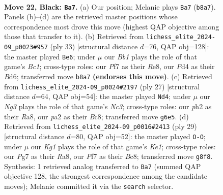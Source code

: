 \documentclass[11pt]{article}
\begin{document}
\clearpage

\begin{figure}[p]\centering
\begin{subfigure}{0.46\textwidth}\centering
\resizebox{\linewidth}{!}{%
\newchessgame
\chessboard[
  setfen={rb2r1k1/1p1b1ppp/pq2p1n1/8/3p2P1/1P5B/P2P1PQP/RNB1RK2 b - - 1 22},
  showmover=false,
  pgfstyle=straightmove, color=movearrow, markmove={b8-a7}
]}
\caption{}
\end{subfigure}\hfill
\begin{subfigure}{0.46\textwidth}\centering
\resizebox{\linewidth}{!}{%
\newchessgame
\chessboard[
  setfen={r1b1r1k1/5pp1/p1pb2qp/2p1p3/8/3P1Q1P/PPPN1PP1/R1B1R1K1 b - - 3 17},
  showmover=false,
  pgfstyle=straightmove, color=movearrow, markmove={c8-e6}
]}
\caption{}
\end{subfigure}
\\[4pt]
\begin{subfigure}{0.46\textwidth}\centering
\resizebox{\linewidth}{!}{%
\newchessgame
\chessboard[
  setfen={r1bq1rk1/1pp2ppp/p1np4/2b5/4PP2/PPN5/1BPQB1PP/R3K2R b KQ - 0 14},
  showmover=false,
  pgfstyle=straightmove, color=movearrow, markmove={c6-d4}
]}
\caption{}
\end{subfigure}\hfill
\begin{subfigure}{0.46\textwidth}\centering
\resizebox{\linewidth}{!}{%
\newchessgame
\chessboard[
  setfen={r1b1k2r/1p1pnpbp/pq2p1p1/8/2P2B2/P1N2Q2/1P3PPP/2KR1B1R b kq - 2 15},
  showmover=false,
  pgfstyle=straightmove, color=movearrow, markmove={e8-g8}
]}
\caption{}
\end{subfigure}
\caption{\textbf{Move 22, Black: \texttt{Ba7}.} (a) Our position; Melanie plays \texttt{Ba7} (\texttt{b8a7}). Panels (b)--(d) are the retrieved master positions whose correspondence most drove this move (highest QAP objective among those that transfer to it). (b) Retrieved from \texttt{lichess\_elite\_2024-09\_p0023\#957} (ply 33) [structural distance $d$=76, QAP obj=128]: the master played \texttt{Be6}; under $\mu$ our \emph{Bb1} plays the role of that game's \emph{Bc1}; cross-type roles: our \emph{P}f7 as their \emph{R}e8, our \emph{P}d4 as their \emph{B}d6; transferred move \texttt{b8a7} \textbf{(endorses this move)}. (c) Retrieved from \texttt{lichess\_elite\_2024-09\_p0024\#2197} (ply 27) [structural distance $d$=64, QAP obj=54]: the master played \texttt{Nd4}; under $\mu$ our \emph{Ng3} plays the role of that game's \emph{Nc3}; cross-type roles: our \emph{p}h2 as their \emph{R}a8, our \emph{p}a2 as their \emph{B}c8; transferred move \texttt{g6e5}. (d) Retrieved from \texttt{lichess\_elite\_2024-09\_p0016\#2413} (ply 29) [structural distance $d$=80, QAP obj=52]: the master played \texttt{O-O}; under $\mu$ our \emph{Kg1} plays the role of that game's \emph{Ke1}; cross-type roles: our \emph{P}g7 as their \emph{R}a8, our \emph{P}f7 as their \emph{B}c8; transferred move \texttt{g8f8}. Synthesis: 1 retrieved analog transferred to \texttt{Ba7} (summed QAP objective 128, the strongest correspondence among the candidate moves); Melanie committed it via the \texttt{search} selector.}
\label{fig:thought-m43}
\end{figure}
\end{document}
